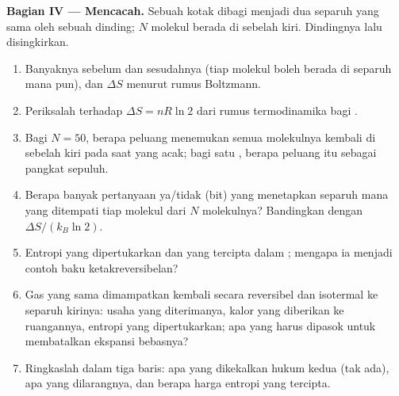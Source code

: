 \begin{problem}
\medskip
\noindent\textbf{Bagian IV --- Mencacah.}
Sebuah kotak dibagi menjadi dua separuh yang sama oleh sebuah dinding; $N$ molekul
 berada di sebelah kiri. Dindingnya lalu disingkirkan.
\begin{enumerate}[resume]
  \item Banyaknya  sebelum dan sesudahnya (tiap molekul boleh berada di
        separuh mana pun), dan $\Delta S$ menurut rumus Boltzmann.
  \item Periksalah terhadap $\Delta S = nR\ln2$ dari rumus termodinamika
        bagi .
  \item Bagi $N = 50$, berapa peluang menemukan semua molekulnya kembali di sebelah
        kiri pada saat yang acak; bagi satu , berapa 
        peluang itu sebagai pangkat sepuluh.
  \item Berapa banyak pertanyaan ya/tidak (bit) yang menetapkan separuh mana yang ditempati tiap
        molekul dari $N$ molekulnya? Bandingkan dengan $\Delta S/(k_B\ln2)$.
  \item Entropi yang dipertukarkan dan yang tercipta dalam ; mengapa ia
        menjadi contoh baku ketakreversibelan?
  \item Gas yang sama dimampatkan kembali secara reversibel dan isotermal ke
        separuh kirinya: usaha yang diterimanya, kalor yang diberikan ke ruangannya, entropi yang
        dipertukarkan; apa yang harus dipasok untuk membatalkan ekspansi bebasnya?
  \item Ringkaslah dalam tiga baris: apa yang dikekalkan hukum kedua
        (tak ada), apa yang dilarangnya, dan berapa harga entropi yang tercipta.
\end{enumerate}
\end{problem}
